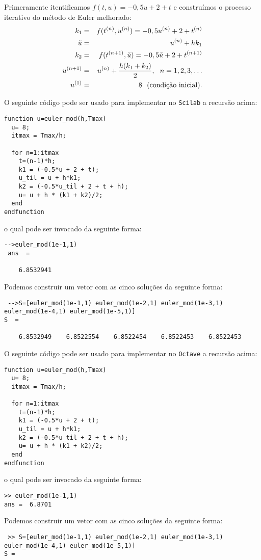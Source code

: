 \begin{resol} Primeramente itentificamos $f(t,u)=-0,5u+2+t$ e construímos o processo iterativo do método de Euler melhorado:
\begin{eqnarray}
  k_1&=&  f(t^{(n)},u^{(n)})=-0,5u^{(n)}+2+t^{(n)}\\
  \tilde{u}&=& u^{(n)} + hk_1\\
  k_2&=&  f(t^{(n+1)},\tilde{u})=-0,5\tilde{u}+2+t^{(n+1)}\\
  u^{(n+1)}&=&u^{(n)} + \dfrac{h( k_1+k_2)}{2},~~n=1,2,3,\ldots\\
  u^{(1)}&=&8 ~~ \hbox{\text{(condição inicial)}}.
\end{eqnarray}

\ifisscilab
O seguinte código pode ser usado para implementar no \verb+Scilab+ a recursão acima:
\begin{verbatim}
function u=euler_mod(h,Tmax)
  u= 8;
  itmax = Tmax/h;

  for n=1:itmax
    t=(n-1)*h;
    k1 = (-0.5*u + 2 + t);
    u_til = u + h*k1;
    k2 = (-0.5*u_til + 2 + t + h);
    u= u + h * (k1 + k2)/2;
  end
endfunction
\end{verbatim}
o qual pode ser invocado da seguinte forma:
\begin{verbatim}
-->euler_mod(1e-1,1)
 ans  =

    6.8532941
\end{verbatim}
Podemos construir um vetor com as cinco soluções da seguinte forma:
\begin{verbatim}
 -->S=[euler_mod(1e-1,1) euler_mod(1e-2,1) euler_mod(1e-3,1) euler_mod(1e-4,1) euler_mod(1e-5,1)]
S  =

    6.8532949    6.8522554    6.8522454    6.8522453    6.8522453
 \end{verbatim}
\fi
\ifisoctave
O seguinte código pode ser usado para implementar no \verb+Octave+ a recursão acima:
\begin{verbatim}
function u=euler_mod(h,Tmax)
  u= 8;
  itmax = Tmax/h;

  for n=1:itmax
    t=(n-1)*h;
    k1 = (-0.5*u + 2 + t);
    u_til = u + h*k1;
    k2 = (-0.5*u_til + 2 + t + h);
    u= u + h * (k1 + k2)/2;
  end
endfunction
\end{verbatim}
o qual pode ser invocado da seguinte forma:
\begin{verbatim}
>> euler_mod(1e-1,1)
ans =  6.8701
\end{verbatim}
Podemos construir um vetor com as cinco soluções da seguinte forma:
\begin{verbatim}
 >> S=[euler_mod(1e-1,1) euler_mod(1e-2,1) euler_mod(1e-3,1) euler_mod(1e-4,1) euler_mod(1e-5,1)]
S =


\end{verbatim}
\end{resol}
